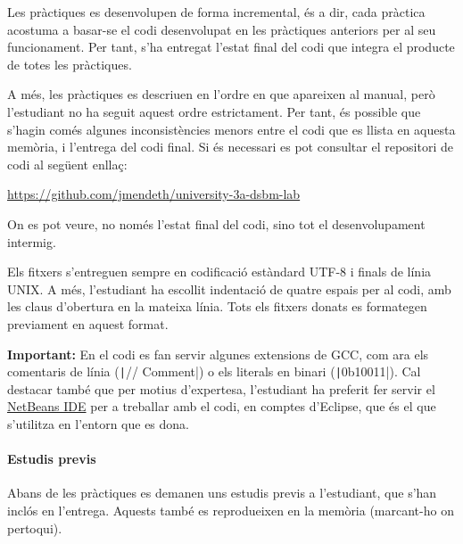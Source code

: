 \documentclass[catalan,parskip=half*,oneside,DIV=11,hidelinks]{scrreprt}
\begin{document}
Les pràctiques es desenvolupen de forma incremental, és a dir, cada pràctica acostuma a
basar-se el codi desenvolupat en les pràctiques anteriors per al seu funcionament. Per tant, s'ha
entregat l'estat final del codi que integra el producte de totes les pràctiques.

A més, les pràctiques es descriuen en l'ordre en que apareixen al manual, però l'estudiant no
ha seguit aquest ordre estrictament. Per tant, és possible que s'hagin comés algunes
inconsistències menors entre el codi que es llista en aquesta memòria, i l'entrega del
codi final. Si és necessari es pot consultar el repositori de codi al següent enllaç:

\url{https://github.com/jmendeth/university-3a-dsbm-lab}

On es pot veure, no només l'estat final del codi, sino tot el desenvolupament intermig.

Els fitxers s'entreguen sempre en codificació estàndard UTF-8 i finals de línia UNIX. %
A més, l'estudiant ha escollit indentació de quatre espais per al codi, amb les claus d'obertura
en la mateixa línia. Tots els fitxers donats es formategen previament en aquest format.

\textbf{Important:} En el codi es fan servir algunes extensions de GCC, com ara els
comentaris de línia (\texttt|// Comment|) o els literals en binari (\texttt|0b10011|).
Cal destacar també que per motius d'expertesa, l'estudiant ha preferit fer servir el
\href{http://netbeans.org}{NetBeans IDE} per a treballar amb el codi, en comptes d'Eclipse,
que és el que s'utilitza en l'entorn que es dona.

\paragraph{Estudis previs}

Abans de les pràctiques es demanen uns estudis previs a l'estudiant, que s'han inclós en l'entrega.
Aquests també es reprodueixen en la memòria (marcant-ho on pertoqui).


\newcommand{\projectname}{}
\newcommand{\inputproject}[1]{
  \dumpaccum
  \renewcommand{\projectname}{#1}
  
}
\end{document}
